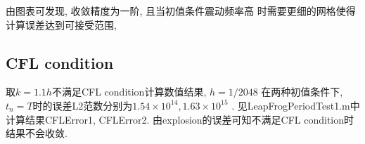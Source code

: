 \begin{figure}[!h]
  \centering
\end{figure}

由图表可发现, 收敛精度为一阶, 且当初值条件震动频率高
时需要更细的网格使得计算误差达到可接受范围,


\subsection{CFL condition}
取$k = 1.1h$不满足CFL condition计算数值结果, $h = 1/2048$
在两种初值条件下, $t_n = T$时的误差L2范数分别为$1.54 \times 10^{14},
  1.63 \times 10^{15}$ .
见LeapFrogPeriodTest1.m中计算结果CFLError1, CFLError2.
由explosion的误差可知不满足CFL condition时结果不会收敛.